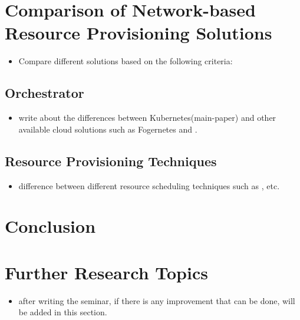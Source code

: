\section{Comparison of Network-based Resource Provisioning Solutions}
\label{sec:related_work}
\begin{itemize}
  \item Compare different solutions based on the following criteria:
\end{itemize}
\subsection{Orchestrator}
\label{sec:infra}
\begin{itemize}
  \item write about the differences between Kubernetes(main-paper)\cite{Santos2019} and other available cloud solutions such as Fogernetes\cite{Wobker2018} and \cite{Reale}.
\end{itemize}

\subsection{Resource Provisioning Techniques}
\begin{itemize}
  \item difference between different resource scheduling techniques such  as \cite{Bittencourt2017}, \cite{Haja2019} etc.
\end{itemize}

\section{Conclusion}
\label{sec:concl}

\section{Further Research Topics}
\label{sec:research}
\begin{itemize}
  \item after writing the seminar, if there is any improvement that can be done, will be added in this section.
\end{itemize}

